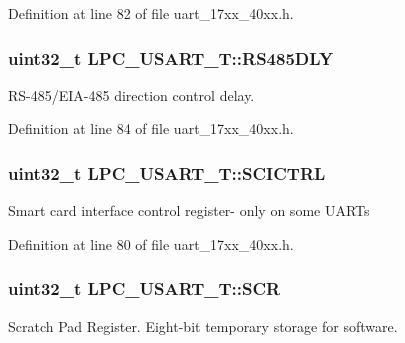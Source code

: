 Definition at line 82 of file uart\+\_\+17xx\+\_\+40xx.\+h.

\subsubsection[{\texorpdfstring{R\+S485\+D\+LY}{RS485DLY}}]{ uint32\+\_\+t L\+P\+C\+\_\+\+U\+S\+A\+R\+T\+\_\+\+T\+::\+R\+S485\+D\+LY}\hypertarget{structLPC__USART__T_a6e9fc8109a269820386a36c81dc943ab}{}\label{structLPC__USART__T_a6e9fc8109a269820386a36c81dc943ab}
R\+S-\/485/\+E\+I\+A-\/485 direction control delay. 

Definition at line 84 of file uart\+\_\+17xx\+\_\+40xx.\+h.

\subsubsection[{\texorpdfstring{S\+C\+I\+C\+T\+RL}{SCICTRL}}]{ uint32\+\_\+t L\+P\+C\+\_\+\+U\+S\+A\+R\+T\+\_\+\+T\+::\+S\+C\+I\+C\+T\+RL}\hypertarget{structLPC__USART__T_aa8ad1461441995d0b618ff7f5b0e42be}{}\label{structLPC__USART__T_aa8ad1461441995d0b618ff7f5b0e42be}
Smart card interface control register-\/ only on some U\+A\+R\+Ts 

Definition at line 80 of file uart\+\_\+17xx\+\_\+40xx.\+h.

\subsubsection[{\texorpdfstring{S\+CR}{SCR}}]{ uint32\+\_\+t L\+P\+C\+\_\+\+U\+S\+A\+R\+T\+\_\+\+T\+::\+S\+CR}\hypertarget{structLPC__USART__T_a28417e4b3d19fcbb6c6ef116376ed58b}{}\label{structLPC__USART__T_a28417e4b3d19fcbb6c6ef116376ed58b}
Scratch Pad Register. Eight-\/bit temporary storage for software. 

